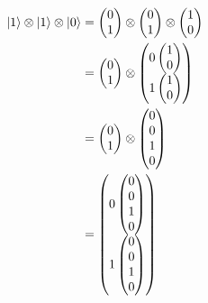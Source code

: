 \documentclass[12pt]{extarticle}
\begin{document}
\begin{align*}
\ket{1} \otimes \ket{1} \otimes \ket{0} & = \begin{pmatrix} 0 \\ 1 \end{pmatrix} \otimes \begin{pmatrix} 0 \\ 1 \end{pmatrix} \otimes \begin{pmatrix} 1 \\ 0 \end{pmatrix} \\
& = \begin{pmatrix} 0 \\ 1 \end{pmatrix} \otimes \begin{pmatrix} 0 \begin{pmatrix} 1 \\ 0 \end{pmatrix} \\ 1 \begin{pmatrix} 1 \\ 0 \end{pmatrix} \end{pmatrix} \\
& = \begin{pmatrix} 0 \\ 1 \end{pmatrix} \otimes \begin{pmatrix} 0 \\ 0 \\ 1 \\ 0 \end{pmatrix} \\
& = \begin{pmatrix} 0 \begin{pmatrix} 0 \\ 0 \\ 1 \\ 0 \end{pmatrix} \\ 1 \begin{pmatrix} 0 \\ 0 \\ 1 \\ 0 \end{pmatrix} \end{pmatrix} \\

\end{align*}
\end{document}
